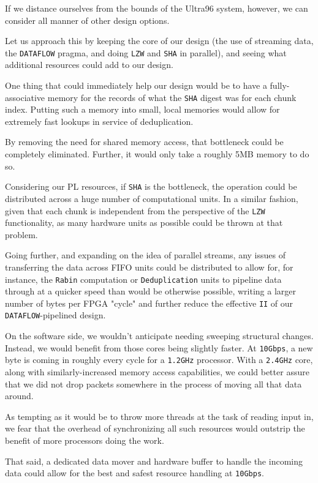 \documentclass{article}
\begin{document}
If we distance ourselves from the bounds of the Ultra96 system, however, we can consider all manner of other design options.
\par
Let us approach this by keeping the core of our design (the use of streaming data, the \texttt{DATAFLOW} pragma, and doing \texttt{LZW} and \texttt{SHA} in parallel), and seeing what additional resources could add to our design.
\newline\par
One thing that could immediately help our design would be to have a fully-associative memory for the records of what the \texttt{SHA} digest was for each chunk index. Putting such a memory into small, local memories would allow for extremely fast lookups in service of deduplication.
\par
By removing the need for shared memory access, that bottleneck could be completely eliminated. Further, it would only take a roughly 5MB memory to do so.
\newline\par
Considering our PL resources, if \texttt{SHA} is the bottleneck, the operation could be distributed across a huge number of computational units. In a similar fashion, given that each chunk is independent from the perspective of the \texttt{LZW} functionality, as many hardware units as possible could be thrown at that problem.
\par
Going further, and expanding on the idea of parallel streams, any issues of transferring the data across FIFO units could be distributed to allow for, 
for instance, the \texttt{Rabin} computation or \texttt{Deduplication} units to pipeline data through at a quicker speed than would be otherwise possible, 
writing a larger number of bytes per FPGA "cycle" and further reduce the effective \texttt{II} of our \texttt{DATAFLOW}-pipelined design.
\newline\par
On the software side, we wouldn't anticipate needing sweeping structural changes. Instead, we would benefit from those cores being slightly faster. At \texttt{10Gbps}, a new byte is coming in roughly every cycle for a \texttt{1.2GHz} processor. 
With a \texttt{2.4GHz} core, along with similarly-increased memory access capabilities, we could better assure that we did not drop packets somewhere in the process of moving all that data around.
\par 
As tempting as it would be to throw more threads at the task of reading input in, we fear that the overhead of synchronizing all such resources would outstrip the benefit of more processors doing the work.
\par
That said, a dedicated data mover and hardware buffer to handle the incoming data could allow for the best and safest resource handling at \texttt{10Gbps}.
\end{document}
